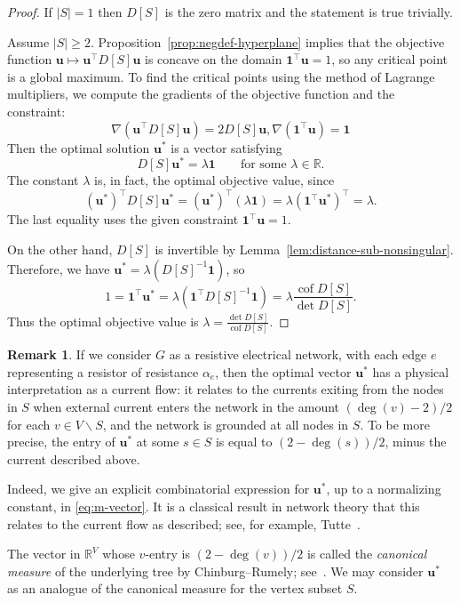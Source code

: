 \documentclass[12pt]{amsart}
\theoremstyle{definition}
\newtheorem{rmk}[thm]{Remark}
\newcommand{\RR}{\mathbb{R}}
\newcommand{\bone}{\mathbf{1}}
\newcommand{\boldu}{\mathbf{u}}
\newcommand{\tr}{\intercal}
\DeclareMathOperator{\cof}{cof}
\begin{document}
\begin{proof}
If $|S| = 1$ then $D[S]$ is the zero matrix and the statement is true trivially.

Assume $|S| \geq 2$.
Proposition~\ref{prop:negdef-hyperplane} implies that 
the objective function $\boldu \mapsto \boldu^\tr D[S]\boldu$ is concave on the domain $\bone^\tr \boldu = 1$, so any critical point is a global maximum.
To find the critical points using the method of Lagrange multipliers, we compute the gradients of the objective function and the constraint:
\[\nabla(\boldu^\tr D[S] \boldu)=2 D[S] \boldu, \nabla(\bone^\tr \boldu)=\bone\]
Then the optimal solution $\boldu^*$ is a vector satisfying
\[
	D[S] \boldu^* = \lambda \bone \qquad\text{for some }\lambda \in \RR.
\]
The constant $\lambda$ is, in fact, the optimal objective value, since
\[
	(\boldu^*)^\tr D[S] \boldu^* = (\boldu^*)^\tr (\lambda \bone) = \lambda (\bone^\tr \boldu^*)^\tr = \lambda.
\]
The last equality uses the given constraint $\bone^\tr \boldu = 1$.

On the other hand,
 $D[S]$ is invertible by Lemma~\ref{lem:distance-sub-nonsingular}. Therefore, we have $ \boldu^* = \lambda (D[S]^{-1} \bone) $, so
\[
	1 = \bone^\tr \boldu^* = \lambda (\bone^\tr D[S]^{-1} \bone)
	= \lambda \frac{\cof D[S]}{\det D[S]}.
\]
Thus the optimal objective value is
$\displaystyle
	\lambda = \frac{\det D[S]}{\cof D[S]} .
$
\end{proof}

\begin{rmk}
	If we consider $G$ as a resistive electrical network, with each edge $e$ representing a resistor of resistance $\alpha_e$,
	then the optimal vector $\boldu^*$ has a physical interpretation as a current flow: 
	it relates to the currents exiting from the nodes in $S$ when external current enters the network in the amount $(\deg(v) - 2)/2$ for each $v \in V \backslash S$, 
	and the network is grounded at all nodes in $S$.
	To be more precise, the entry of $\boldu^*$ at some $s \in S$ is equal to $(2 - \deg(s)) / 2$, minus the current described above.

	Indeed, we give an explicit combinatorial expression for $\boldu^*$, up to a normalizing constant, in \eqref{eq:m-vector}. 
	It is a classical result in network theory that this relates to the current flow as described; 
	see, for example, Tutte~\cite[Section VI.6]{tutte}.

	The vector in $\RR^V$ whose $v$-entry is $(2 - \deg(v))/2$ is called the {\em canonical measure} of the underlying tree by Chinburg--Rumely; see~\cite[Section 14]{baker-rumely}.
	We may consider $\boldu^*$ as an analogue of the {canonical measure} for the vertex subset $S$.
\end{rmk}
\end{document}
